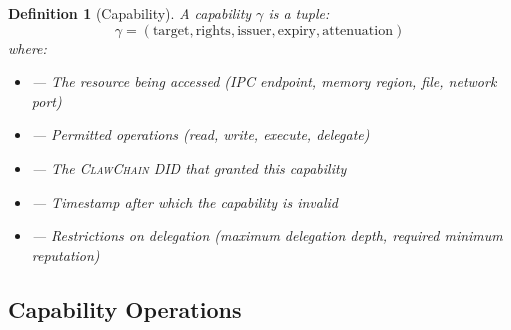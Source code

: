 \documentclass{article}
\newtheorem{definition}{Definition}
\newcommand{\clawchain}{\textsc{ClawChain}}
\begin{document}
\begin{definition}[Capability]
A capability $\gamma$ is a tuple:
$$\gamma = (\text{target}, \text{rights}, \text{issuer}, \text{expiry}, \text{attenuation})$$
where:
\begin{itemize}[leftmargin=1.5cm]
    \item[\textnormal{target}] — The resource being accessed (IPC endpoint, memory region, file, network port)
    \item[\textnormal{rights}] — Permitted operations (read, write, execute, delegate)
    \item[\textnormal{issuer}] — The \clawchain{} DID that granted this capability
    \item[\textnormal{expiry}] — Timestamp after which the capability is invalid
    \item[\textnormal{attenuation}] — Restrictions on delegation (maximum delegation depth, required minimum reputation)
\end{itemize}
\end{definition}

\subsection{Capability Operations}
\end{document}
